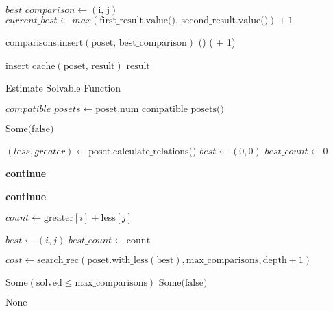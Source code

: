 \documentclass[a4paper]{article}
\begin{document}
\begin{algorithm}
\begin{algorithmic}[1]
        \State $best\_comparison \gets (\text{i, j})$
        \State $current\_best \gets max(\text{first\_result.value(), second\_result.value()}) + 1$
        \EndFor
        \State

        \State $\text{comparisons.insert}(\text{poset, best\_comparison})$
        \State \Return {}()
        \Else
        \State \Return {}( + 1)
        \EndIf

        \State $\text{insert\_cache}(\text{poset, result})$ 
        \State \Return $\text{result}$
        \EndFunction
    \end{algorithmic}
\end{algorithm}



\begin{algorithm}
    \caption{Estimate Solvable Function}
    \begin{algorithmic}[1]
        \State $compatible\_posets \gets \text{poset.num\_compatible\_posets()}$

        \State \Return $\text{Some(false)}$
        \EndIf
        \State

        \State $(less, greater) \gets \text{poset.calculate\_relations()}$
        \State $best \gets (0, 0)$
        \State $best\_count \gets 0$
        \State

        \State \textbf{continue}
        \EndIf
        \State

        \State \textbf{continue}
        \EndIf
        \State

        \State $count \gets \text{greater}[i] + \text{less}[j]$

        \State $best \gets (i, j)$
        \State $best\_count\gets \text{count}$
        \EndIf
        \EndFor
        \EndFor
        \State

        \State $cost \gets \text{search\_rec}(\text{poset.with\_less}(\text{best}), \text{max\_comparisons}, \text{depth} + 1)$

        \State \Return $\text{Some}(\text{solved} \leq \text{max\_comparisons})$
        \EndCase
        \State \Return $\text{Some(false)}$
        \EndCase
        \EndMatch
        \EndIf
        \State

        \State \Return $\text{None}$
        \EndFunction
    \end{algorithmic}
\end{algorithm}
\end{document}
